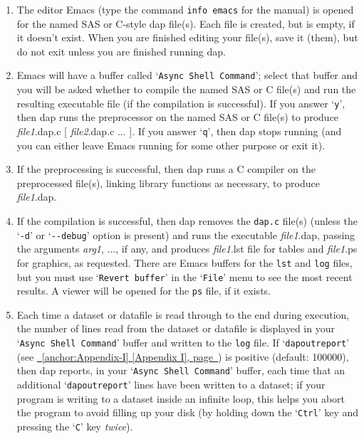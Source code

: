 \documentclass{book}
\newcommand\Texinfocommandstyletextvar[1]{{\normalfont{}\textsl{#1}}}%
\renewcommand{\_}{\Texinfounderscore\discretionary{}{}{}}
\begin{document}
\begin{enumerate}[start=1]
\item The editor Emacs (type the command \texttt{info emacs}
for the manual) is opened for the named SAS or C-style dap file(s).
Each file is created, but is empty, if it doesn't exist.
When you are finished editing your file(s), save it (them), but do not
exit unless you are finished running dap.
\item Emacs will have a buffer called `\texttt{Async Shell Command}'; select that buffer
and you will be
asked whether to compile the named SAS or C file(s) and run the resulting
executable file (if the compilation is successful).
If you answer `\texttt{y}', then dap
runs the preprocessor on the named SAS or C file(s) to produce
\Texinfocommandstyletextvar{file1}.dap.c [ \Texinfocommandstyletextvar{file2}.dap.c ... ].
If you answer `\texttt{q}', then dap stops running (and you can either leave Emacs
running for some other purpose or exit it).

\item If the preprocessing is successful, 
then dap runs a C compiler on the preprocessed file(s), linking
library functions as necessary, to produce \Texinfocommandstyletextvar{file1}.dap.
\item If the compilation is successful, then dap removes the \texttt{dap.c} file(s)
(unless the `\texttt{-d}' or `\texttt{{-}{-}debug}' option is present) and
runs the executable \Texinfocommandstyletextvar{file1}.dap, passing the arguments
\Texinfocommandstyletextvar{arg1}, ..., if any, and produces \Texinfocommandstyletextvar{file1}.lst file for tables
%
%
and \Texinfocommandstyletextvar{file1}.ps for graphics, as requested.
%
%
There are Emacs buffers for
the \texttt{lst} and \texttt{log} files, but you must use
`\texttt{Revert buffer}'
%
in the `\texttt{File}' menu to see the most recent results.
A viewer will be opened for the \texttt{ps} file,
if it exists.

\item Each time a dataset or datafile is read through to the end
during execution, the number
of lines read from the dataset or datafile is displayed in your
`\texttt{Async Shell Command}' buffer and written to the \texttt{log} file.
If `\texttt{dap\_outreport}' (see \hyperref[anchor:Appendix-I]{\chaptername~\ref*{anchor:Appendix-I} [Appendix I], page~\pageref*{anchor:Appendix-I}}) is positive
(default: 100000), then dap reports, in your `\texttt{Async Shell Command}' buffer,
each time that an additional `\texttt{dap\_outreport}'
lines have been written to a dataset;
if your program is writing to a dataset inside an infinite loop,
this helps you abort the program to avoid filling up your disk
(by holding down the `\texttt{Ctrl}' key and pressing the `\texttt{C}' key \emph{twice}).
%


\end{enumerate}
\end{document}
